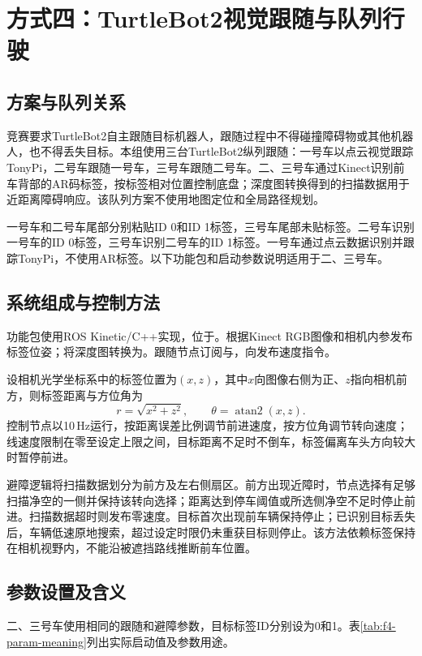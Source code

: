 \section{方式四：TurtleBot2视觉跟随与队列行驶}
\subsection{方案与队列关系}
竞赛要求TurtleBot2自主跟随目标机器人，跟随过程中不得碰撞障碍物或其他机器人，也不得丢失目标。本组使用三台TurtleBot2纵列跟随：一号车以点云视觉跟踪TonyPi，二号车跟随一号车，三号车跟随二号车。二、三号车通过Kinect识别前车背部的AR码标签，按标签相对位置控制底盘；深度图转换得到的扫描数据用于近距离障碍响应。该队列方案不使用地图定位和全局路径规划。

一号车和二号车尾部分别粘贴ID 0和ID 1标签，三号车尾部未贴标签。二号车识别一号车的ID 0标签，三号车识别二号车的ID 1标签。一号车通过点云数据识别并跟踪TonyPi，不使用AR标签。以下功能包和启动参数说明适用于二、三号车。

\subsection{系统组成与控制方法}
功能包使用ROS Kinetic/C++实现，位于。根据Kinect RGB图像和相机内参发布标签位姿；将深度图转换为。跟随节点订阅与，向发布速度指令。

设相机光学坐标系中的标签位置为$(x,z)$，其中$x$向图像右侧为正、$z$指向相机前方，则标签距离与方位角为
\begin{equation}
 r=\sqrt{x^2+z^2},\qquad \theta=\operatorname{atan2}(x,z).
\end{equation}
控制节点以10\,Hz运行，按距离误差比例调节前进速度，按方位角调节转向速度；线速度限制在零至设定上限之间，目标距离不足时不倒车，标签偏离车头方向较大时暂停前进。

避障逻辑将扫描数据划分为前方及左右侧扇区。前方出现近障时，节点选择有足够扫描净空的一侧并保持该转向选择；距离达到停车阈值或所选侧净空不足时停止前进。扫描数据超时则发布零速度。目标首次出现前车辆保持停止；已识别目标丢失后，车辆低速原地搜索，超过设定时限仍未重获目标则停止。该方法依赖标签保持在相机视野内，不能沿被遮挡路线推断前车位置。

\subsection{参数设置及含义}
二、三号车使用相同的跟随和避障参数，目标标签ID分别设为0和1。表\ref{tab:f4-param-meaning}列出实际启动值及参数用途。

